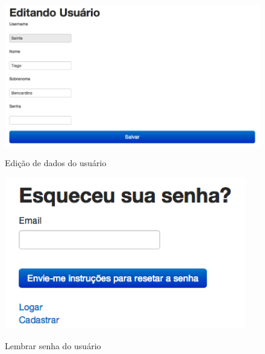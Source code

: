 	 \begin{figure}[H]
	   \centering
	   \includegraphics{figs/railsedituser.png}\\
	   \caption{ Edição de dados do usuário }
	   \label{FIG:railsuseredit}
	 \end{figure}
	 
	 \begin{figure}[H]
	   \centering
	   \includegraphics{figs/railsforgetpass.png}\\
	   \caption{ Lembrar senha do usuário }
	   \label{FIG:railsforgetpass}
	 \end{figure}

